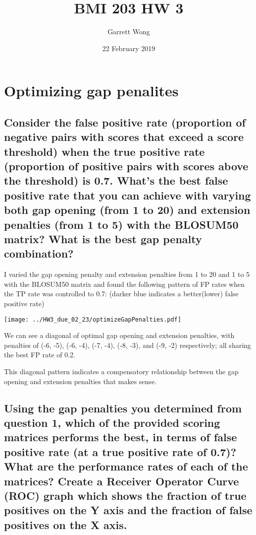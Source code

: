 \documentclass[]{article}
\begin{document}
\title{BMI 203 HW 3}
\author{Garrett Wong}
\date{22 February 2019}
\maketitle


\section{Optimizing gap penalites}

\subsection{Consider the false positive rate (proportion of negative pairs with scores that exceed a score threshold) when the true positive rate (proportion of positive pairs with scores above the threshold) is 0.7. What's the best false positive rate that you can achieve with varying both gap opening (from 1 to 20) and extension penalties (from 1 to 5) with the BLOSUM50 matrix? What is the best gap penalty combination?}

I varied the gap opening penalty and extension penalties from 1 to 20 and 1 to 5 with the BLOSUM50 matrix and found the following pattern of FP rates when the TP rate was controlled to 0.7: (darker blue indicates a better(lower) false positive rate)

\vspace{1em}
\texttt{[image: ../HW3\_due\_02\_23/optimizeGapPenalties.pdf]}
\vspace{1em}

We can see a diagonal of optimal gap opening and extension penalties, with penalties of (-6, -5), (-6, -4), (-7, -4), (-8, -3), and (-9, -2) respectively; all sharing the best FP rate of 0.2.

This diagonal pattern indicates a compensatory relationship between the gap opening and extension penalties that makes sense.

\subsection{Using the gap penalties you determined from question 1, which of the provided scoring matrices performs the best, in terms of false positive rate (at a true positive rate of 0.7)? What are the performance rates of each of the matrices? Create a Receiver Operator Curve (ROC) graph which shows the fraction of true positives on the Y axis and the fraction of false positives on the X axis.}
\end{document}
